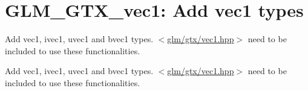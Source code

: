 \hypertarget{group__gtx__vec1}{\section{\-G\-L\-M\-\_\-\-G\-T\-X\-\_\-vec1\-: \-Add vec1 types}
\label{group__gtx__vec1}
}


\-Add vec1, ivec1, uvec1 and bvec1 types. $<$\hyperlink{vec1_8hpp}{glm/gtx/vec1.\-hpp}$>$ need to be included to use these functionalities.  


\-Add vec1, ivec1, uvec1 and bvec1 types. $<$\hyperlink{vec1_8hpp}{glm/gtx/vec1.\-hpp}$>$ need to be included to use these functionalities. 